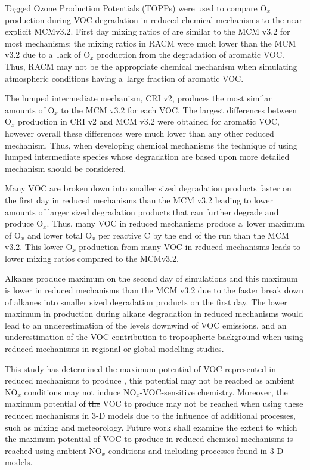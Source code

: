 \documentclass[acpd, online, hvmath]{copernicus}
\providecommand{\DIFadd}[1]{{\protect\color{blue}\uwave{#1}}} %
\providecommand{\DIFdel}[1]{{\protect\color{red}\sout{#1}}}                      %
\providecommand{\DIFaddbegin}{} %
\providecommand{\DIFaddend}{} %
\providecommand{\DIFdelbegin}{} %
\providecommand{\DIFdelend}{} %
\begin{document}
\conclusions

Tagged Ozone Production Potentials (TOPPs) were used to compare
O$_{x}$ production during VOC degradation in reduced chemical
mechanisms to the near-explicit MCM\DIFaddbegin \DIFadd{~}\DIFaddend v3.2.  First day mixing ratios of
 are similar to the MCM v3.2 for most mechanisms; the
 mixing ratios in RACM were much lower than the MCM v3.2 due
to a~lack of O$_{x}$ production from the degradation of aromatic
VOC.  Thus, RACM may not be the appropriate chemical mechanism when
simulating atmospheric conditions having a~large fraction of aromatic
VOC.

The lumped intermediate mechanism, CRI v2, produces the most similar
amounts of O$_{x}$ to the MCM v3.2 for each VOC.  The largest
differences between O$_{x}$ production in CRI v2 and MCM v3.2 were
obtained for aromatic VOC, however overall these differences were much
lower than any other reduced mechanism.  Thus, when developing
chemical mechanisms the technique of using lumped intermediate species
whose degradation are based upon more detailed mechanism should be
considered.

Many VOC are broken down into smaller sized degradation products
faster on the first day in reduced mechanisms than the MCM v3.2
leading to lower amounts of larger sized degradation products that can
further degrade and produce O$_{x}$.  Thus, many VOC in reduced
mechanisms produce a~lower maximum of O$_{x}$ and lower total
O$_{x}$ per reactive C by the end of the run than the MCM v3.2.
This lower O$_{x}$ production from many VOC in reduced mechanisms
leads to lower  mixing ratios compared to the MCM\DIFaddbegin \DIFadd{~}\DIFaddend v3.2.

Alkanes produce maximum  on the second day of simulations
and this maximum is lower in reduced mechanisms than the MCM v3.2 due
to the faster break down of alkanes into smaller sized degradation
products on the first day.  The lower maximum in  production
during alkane degradation in reduced mechanisms would lead to an
underestimation of the  levels downwind of VOC emissions,
and an underestimation of the VOC contribution to tropospheric
background  when using reduced mechanisms in regional or
global modelling studies.

This study has determined the maximum potential of VOC represented in
reduced mechanisms to produce , this potential may not be
reached as ambient NO$_{x}$ conditions may not induce
NO$_{x}$-VOC-sensitive chemistry.  Moreover, the maximum potential
of \DIFdelbegin \DIFdel{the }\DIFdelend VOC to produce  may not be reached when using these
reduced mechanisms in 3-D models due to the influence of additional
processes, such as mixing and meteorology.  Future work shall examine
the extent to which the maximum potential of VOC to produce 
in reduced chemical mechanisms is reached using ambient NO$_{x}$
conditions and including processes found in 3-D models.
\end{document}

